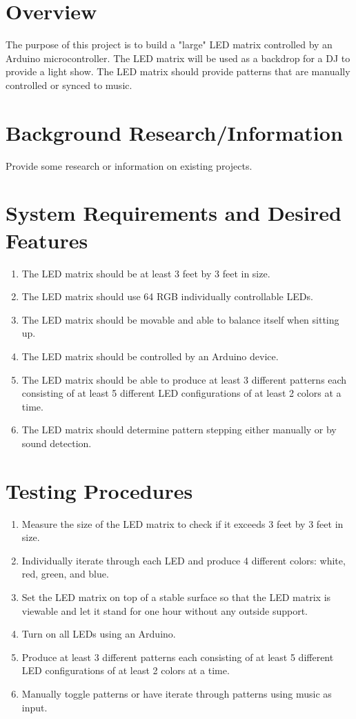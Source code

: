 \documentclass[12pt]{article}
\begin{document}
\maketitle


\section{Overview}
The purpose of this project is to build a "large" LED matrix controlled by an Arduino microcontroller. The LED matrix will be used as a backdrop for a DJ to provide a light show. The LED matrix should provide patterns that are manually controlled or synced to music.

\section{Background Research/Information}
Provide some research or information on existing projects.

\section{System Requirements and Desired Features}
\begin{enumerate}
\item The LED matrix should be at least 3 feet by 3 feet in size.
\item The LED matrix should use 64 RGB individually controllable LEDs.
\item The LED matrix should be movable and able to balance itself when sitting up.
\item The LED matrix should be controlled by an Arduino device.
\item The LED matrix should be able to produce at least 3 different patterns each consisting of at least 5 different LED configurations of at least 2 colors at a time.
\item The LED matrix should determine pattern stepping either manually or by sound detection.
\end{enumerate}

\section{Testing Procedures}
\begin{enumerate}
\item Measure the size of the LED matrix to check if it exceeds 3 feet by 3 feet in size.
\item Individually iterate through each LED and produce 4 different colors: white, red, green, and blue.
\item Set the LED matrix on top of a stable surface so that the LED matrix is viewable and let it stand for one hour without any outside support.
\item Turn on all LEDs using an Arduino.
\item Produce at least 3 different patterns each consisting of at least 5 different LED configurations of at least 2 colors at a time.
\item Manually toggle patterns or have iterate through patterns using music as input.
\end{enumerate}
\end{document}
